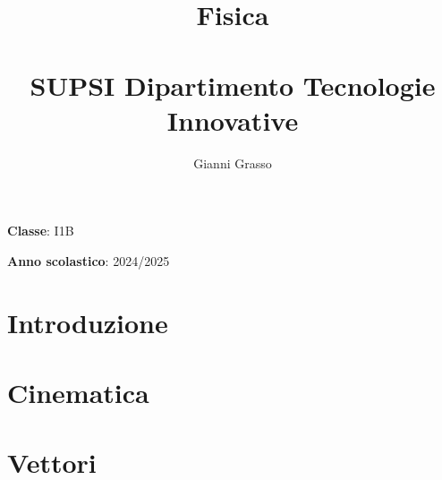 \documentclass{article}
\title{
    Fisica \\
    \phantom{}\\
    \large SUPSI Dipartimento Tecnologie Innovative
}
\author{Gianni Grasso}
\begin{document}
\maketitle
\hphantom{ }
\vspace{14.5cm}

\textbf{Classe}: I1B

\textbf{Anno scolastico}: 2024/2025
\pagebreak


\tableofcontents
\pagebreak

\section{Introduzione}

\pagebreak

\section{Cinematica}

\pagebreak

\section{Vettori}

\pagebreak
\end{document}
